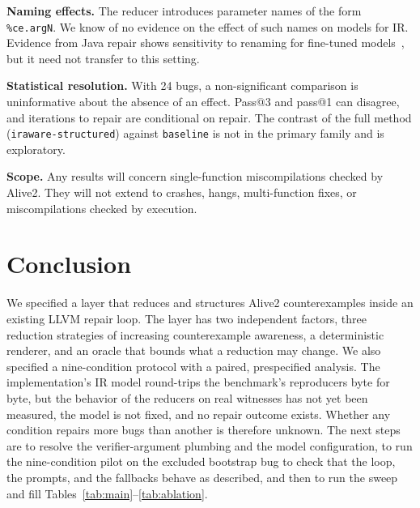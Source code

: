 \documentclass[conference]{IEEEtran}
\newcommand{\cn}[1]{\texttt{#1}}   %
\begin{document}
\textbf{Naming effects.} The reducer introduces parameter names of the form \texttt{\%ce.argN}. We know of no evidence on the effect of such names on models for IR. Evidence from Java repair shows sensitivity to renaming for fine-tuned models~\cite{rabbi2026hej}, but it need not transfer to this setting.

\textbf{Statistical resolution.} With 24 bugs, a non-significant comparison is uninformative about the absence of an effect. Pass@3 and pass@1 can disagree, and iterations to repair are conditional on repair. The contrast of the full method (\cn{iraware-structured}) against \cn{baseline} is not in the primary family and is exploratory.

\textbf{Scope.} Any results will concern single-function miscompilations checked by Alive2. They will not extend to crashes, hangs, multi-function fixes, or miscompilations checked by execution.

\section{Conclusion}

We specified a layer that reduces and structures Alive2 counterexamples inside an existing LLVM repair loop. The layer has two independent factors, three reduction strategies of increasing counterexample awareness, a deterministic renderer, and an oracle that bounds what a reduction may change. We also specified a nine-condition protocol with a paired, prespecified analysis. The implementation's IR model round-trips the benchmark's reproducers byte for byte, but the behavior of the reducers on real witnesses has not yet been measured, the model is not fixed, and no repair outcome exists. Whether any condition repairs more bugs than another is therefore unknown. The next steps are to resolve the verifier-argument plumbing and the model configuration, to run the nine-condition pilot on the excluded bootstrap bug to check that the loop, the prompts, and the fallbacks behave as described, and then to run the sweep and fill Tables~\ref{tab:main}--\ref{tab:ablation}.



\end{document}
